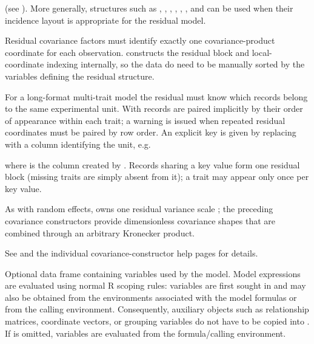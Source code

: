\documentclass[a4paper]{book}
\begin{document}
\begin{Arguments}
\begin{ldescription}

(see ). More generally,
structures such as , ,
, , ,
, and  can be used when their incidence
layout is appropriate for the residual model.

Residual covariance factors must identify exactly one covariance-product
coordinate for each observation.  constructs the residual block
and local-coordinate indexing internally, so the data do  need to
be manually sorted by the variables defining the residual structure.

 For a long-format
multi-trait model the residual must know which records belong to the same
experimental unit. With  records are paired implicitly by
their order of appearance within each trait; a warning is issued when
repeated residual coordinates must be paired by row order. An explicit key is given by replacing
 with a column identifying the unit, e.g.


where  is the column created by .
Records sharing a key value form one residual block (missing traits are
simply absent from it); a trait may appear only once per key value.

As with random effects,  owns one residual variance scale
; the preceding covariance constructors provide dimensionless
covariance shapes that are combined through an arbitrary Kronecker product.

See  and the individual covariance-constructor help pages
for details.


\item[\code{data}] Optional data frame containing variables used by the model.
Model expressions are evaluated using normal R scoping rules: variables are first
sought in  and may also be obtained from the environments associated
with the model formulas or from the calling environment. Consequently, auxiliary
objects such as relationship matrices, coordinate vectors, or grouping variables
do not have to be copied into . If  is omitted, variables
are evaluated from the formula/calling environment.


\end{ldescription}
\end{Arguments}
\end{document}
